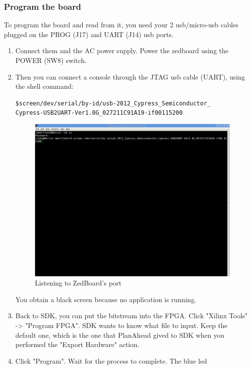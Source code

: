 \documentclass{article}
\begin{document}
	\subsubsection{Program the board}
		To program the board and read from it, you need your 2 usb/micro-usb
		cables plugged on the PROG (J17) and UART (J14) usb ports.
		\begin{enumerate}
		\item Connect them and the AC power supply. Power the zedboard using the
		POWER (SW8) switch.
		\item Then you can connect a console through the JTAG usb cable (UART), using the
		shell command:
		\begin{alltt}
		\$ screen /dev/serial/by-id/usb-2012\_Cypress\_Semiconductor\_
		Cypress-USB2UART-Ver1.0G\_027211C91A19-if00 115200
		\end{alltt}
	\begin{figure}
	\begin{center}
	\includegraphics[scale=0.25]{pictures/ListenToPort.png}
	\end{center}
	\caption{Listening to ZedBoard's port}
	\end{figure}
		You obtain a black screen because no application is running.
		\item Back to SDK, you can put the bitstream into the FPGA. Click
		"Xilinx Tools" -> "Program FPGA". SDK wants to know what file to input.
		Keep the default one, which is the one that PlanAhead gived to SDK when
		you performed the "Export Hardware" action.
		\item Click "Program". Wait for the process to complete. The blue led

\end{enumerate}
\end{document}
